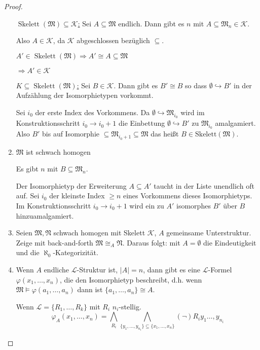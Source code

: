 \documentclass[12pt,parskip=full]{scrartcl}
\newcommand{\abs}[1]{{\left| #1 \right|}}
\newcommand{\heading}{\underline}
\theoremstyle{definition}
\begin{document}
\begin{proof}
\begin{enumerate}
			\heading{$\operatorname{Skelett}(\mathfrak{M}) \subseteq \mathcal{K}$:} Sei $A \subseteq \mathfrak{M}$ endlich. Dann gibt es $n$ mit $A \subseteq \mathfrak{M}_n \in \mathcal{K}$.
			
			Also $A \in \mathcal{K}$, da $\mathcal{K}$ abgeschlossen bezüglich $\subseteq$.
			
			$A' \in \operatorname{Skelett}(\mathfrak{M}) \Rightarrow A' \cong A \subseteq \mathfrak{M}$
			
			$\Rightarrow A' \in \mathcal{K}$
			
			\heading{$K \subseteq \operatorname{Skelett}(\mathfrak{M})$:} Sei $B \in \mathcal{K}$. Dann gibt es $B' \cong B$ so dass $\emptyset \hookrightarrow B'$ in der Aufzählung der Isomorphietypen vorkommt.
			
			Sei $i_0$ der erste Index des Vorkommens. Da $\emptyset \hookrightarrow \mathfrak{M}_{i_0}$ wird im Konstruktionsschritt $i_0 \to i_0 + 1$ die Einbettung $\emptyset \hookrightarrow B'$ zu $\mathfrak{M}_{i_0}$ amalgamiert. Also $B'$ bis auf Isomorphie $\subseteq \mathfrak{M}_{i_0 + 1} \subseteq \mathfrak{M}$ das heißt $B \in \operatorname{Skelett(\mathfrak{M})}$.
			
			\item $\mathfrak{M}$ ist schwach homogen
			
			Es gibt $n$ mit $B \subseteq \mathfrak{M}_n$.
			
			Der Isomorphietyp der Erweiterung $A \subseteq A'$ taucht in der Liste unendlich oft auf. Sei $i_0$ der kleinste Index $\geq n$ eines Vorkommens dieses Isomorphietyps. Im Konstruktionsschritt $i_0 \to i_0 + 1$ wird ein zu $A'$ isomorphes $B'$ über $B$ hinzuamalgamiert.
			
			\item Seien $\mathfrak{M}, \mathfrak{N}$ schwach homogen mit Skelett $\mathcal{K}$, $A$ gemeinsame Unterstruktur. Zeige mit back-and-forth $\mathfrak{M} \cong_A \mathfrak{N}$. Daraus folgt: mit $A = \emptyset$ die Eindeutigkeit und die $\aleph_0$-Kategorizität.
			
			\item Wenn $A$ endliche $\mathcal{L}$-Struktur ist, $\abs{A} = n$, dann gibt es eine $\mathcal{L}$-Formel $\varphi(x_1, \dots, x_n)$, die den Isomorphietyp beschreibt, d.h. wenn $\mathfrak{M} \models \varphi(a_1, \dots, a_n)$ dann ist $\{ a_1, \dots, a_n \} \cong A$.
			
			Wenn $\mathcal{L} = \{ R_1, \dots, R_k \}$ mit $R_i$ $n_i$-stellig.
			\begin{equation*}
				\varphi_A(x_1, \dots, x_n) = \bigwedge_{R_i} \bigwedge_{\{ y_1, \dots, y_{n_i}\} \subseteq \{ x_1, \dots, x_n  \}} (\lnot) R_i y_1 \dots, y_{n_i}
			\end{equation*}
			

\end{enumerate}
\end{proof}
\end{document}
